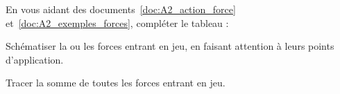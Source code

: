\mesure 
En vous aidant des documents~\ref{doc:A2_action_force} et~\ref{doc:A2_exemples_forces}, compléter le tableau :
\begin{listePoints}
  \item Schématiser la ou les forces entrant en jeu, en faisant attention à leurs points d'application.
  \item Tracer la somme de toutes les forces entrant en jeu.
\end{listePoints}












  
  
  
